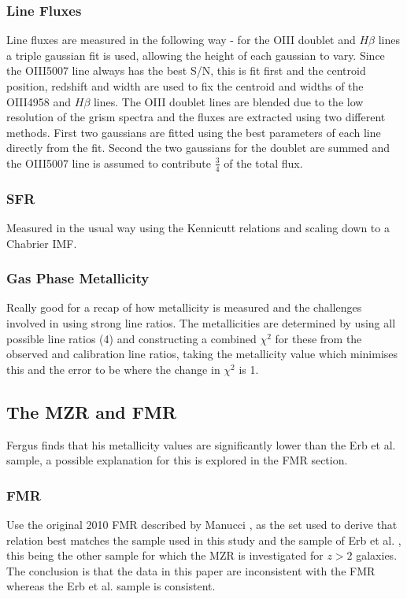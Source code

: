 \documentclass{literature}
\begin{document}
\subsubsection{Line Fluxes}
Line fluxes are measured in the following way - for the OIII doublet and $H\beta$ lines a triple gaussian fit is used, allowing the height of each gaussian to vary. Since the OIII5007 line always has the best S/N, this is fit first and the centroid position, redshift and width are used to fix the centroid and widths of the OIII4958 and $H\beta$ lines. The OIII doublet lines are blended due to the low resolution of the grism spectra and the fluxes are extracted using two different methods. First two gaussians are fitted using the best parameters of each line directly from the fit. Second the two gaussians for the doublet are summed and the OIII5007 line is assumed to contribute $\frac{3}{4}$ of the total flux. 

\subsubsection{SFR}
Measured in the usual way using the Kennicutt relations and scaling down to a Chabrier IMF. 

\subsubsection{Gas Phase Metallicity}
Really good for a recap of how metallicity is measured and the challenges involved in using strong line ratios. The metallicities are determined by using all possible line ratios (4) and constructing a combined $\chi^{2}$ for these from the observed and calibration line ratios, taking the metallicity value which minimises this and the error to be where the change in $\chi^{2}$ is 1. 

\subsection{The MZR and FMR}
Fergus finds that his metallicity values are significantly lower than the Erb et al. sample, a possible explanation for this is explored in the FMR section. 

\subsubsection{FMR}
Use the original 2010 FMR described by Manucci \citep{Mannucci2010}, as the set used to derive that relation best matches the sample used in this study and the sample of Erb et al. \citep{Erb_2006}, this being the other sample for which the MZR is investigated for $z > 2$ galaxies. The conclusion is that the data in this paper are inconsistent with the FMR whereas the Erb et al. sample is consistent.
\end{document}
